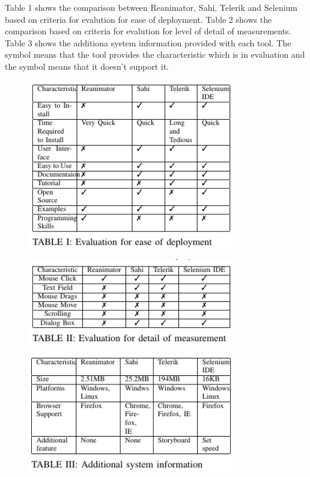 \documentclass[12pt,journal]{IEEEtran}
\begin{document}
Table 1 shows the comparison between Reanimator, Sahi, Telerik  and Selenium based on criteria for evalution for ease of deployment. Table 2 shows the comparison based on criteria for evalution for level of detail of measurements. Table 3 shows the additiona system information provided with each tool. The symbol  means that the tool provides the characteristic which is in evaluation and the symbol  means that it doesn’t support it. \\

\begin{figure}[h!]
 \hfill\includegraphics[width=9cm]{figures/table1.PNG}\hspace*{\fill}
\end{figure}
\begin{figure}[h!]
 \hfill\includegraphics[width=9cm]{figures/table2.PNG}\hspace*{\fill}
\end{figure}

\begin{figure}[h!]
 \hfill\includegraphics[width=9cm]{figures/table3.PNG}\hspace*{\fill}
\end{figure}
\end{document}
